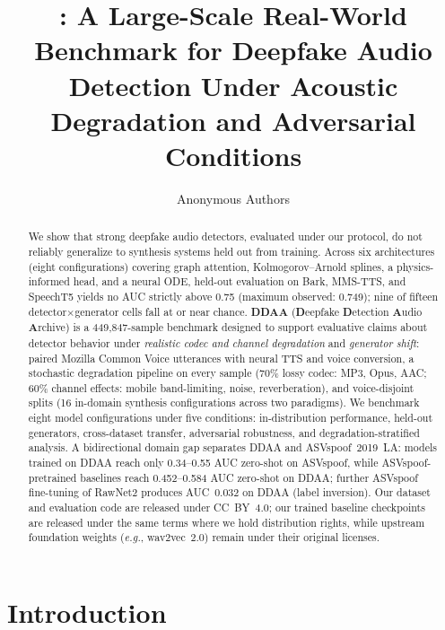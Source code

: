 \documentclass{article}
\title{\ddaa: A Large-Scale Real-World Benchmark for Deepfake Audio\\
  Detection Under Acoustic Degradation and Adversarial Conditions}
\author{%
  Anonymous Authors
}
\newcommand{\ddaa}{\textsc{DDAA}}
\begin{document}
\maketitle

\begin{abstract}
We show that strong deepfake audio detectors, evaluated under our protocol,
do not reliably generalize to synthesis systems held out from training.
Across six architectures (eight configurations) covering graph attention,
Kolmogorov--Arnold splines, a physics-informed head, and a neural ODE,
held-out evaluation on Bark, MMS-TTS, and SpeechT5 yields no AUC strictly
above 0.75 (maximum observed: 0.749); nine of fifteen
detector$\times$generator cells fall at or near chance.
\textbf{\ddaa} (\textbf{D}eepfake \textbf{D}etection \textbf{A}udio \textbf{A}rchive)
is a 449,847-sample benchmark designed to support evaluative claims about
detector behavior under \emph{realistic codec and channel degradation} and
\emph{generator shift}: paired Mozilla Common Voice utterances with neural TTS
and voice conversion, a stochastic degradation pipeline on every sample
(70\% lossy codec: MP3, Opus, AAC; 60\% channel effects: mobile band-limiting,
noise, reverberation), and voice-disjoint splits (16 in-domain synthesis
configurations across two paradigms).
We benchmark eight model configurations under five conditions:
in-distribution performance, held-out generators, cross-dataset transfer,
adversarial robustness, and degradation-stratified analysis.
A bidirectional domain gap separates \ddaa{} and ASVspoof~2019~LA: models
trained on \ddaa{} reach only 0.34--0.55 AUC zero-shot on ASVspoof, while
ASVspoof-pretrained baselines reach 0.452--0.584 AUC zero-shot on \ddaa{};
further ASVspoof fine-tuning of RawNet2 produces AUC~0.032 on \ddaa{}
(label inversion).
Our dataset and evaluation code are released under CC~BY~4.0; our trained
baseline checkpoints are released under the same terms where we hold
distribution rights, while upstream foundation weights (\textit{e.g.}, wav2vec~2.0)
remain under their original licenses.
\end{abstract}

\section{Introduction}
\label{sec:intro}
\end{document}
